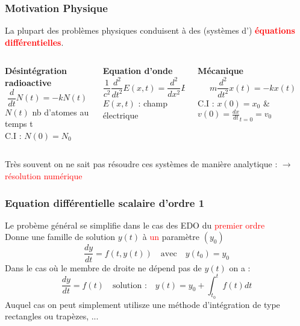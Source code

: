 \documentclass{beamer}
\begin{document}
\begin{frame}
\frametitle{Motivation Physique}
La plupart des problèmes physiques conduisent à des (systèmes d') \textbf{\textcolor{red}{équations différentielles}}. \\
\vspace{0.5cm}
\begin{columns}[t]
\footnotesize
\begin{column}{0.28\textwidth}
\textbf{Désintégration radioactive}
\begin{equation*}
\frac{d}{dt}N(t) = -kN(t)
\end{equation*}
$N(t)$ nb d'atomes au temps t\\
C.I : $N(0)=N_0$
\end{column}
%
\begin{column}{0.38\textwidth}
\textbf{Equation d'onde}
\begin{equation*}
\frac{1}{c^2}\frac{d^2}{dt^2}E(x,t) = \frac{d^2}{dx^2}E(x,t)
\end{equation*}
$E(x,t)$ : champ électrique
\end{column}
%
\begin{column}{0.28\textwidth}
\textbf{Mécanique}
\begin{equation*}
m\frac{d^2}{dt^2}x(t) = -kx(t)
\end{equation*}
C.I : $x(0) = x_0$ \& $v(0) = \frac{dx}{dt}_{t=0} = v_0 $
\end{column}
\end{columns}
\vspace{0.8cm}
Très souvent on ne sait pas résoudre ces systèmes de manière analytique :
\hspace{0.4cm} $\rightarrow$ \textcolor{red}{résolution numérique}

\end{frame}

\begin{frame}
\frametitle{Equation différentielle scalaire d'ordre 1}
Le probème général se simplifie dans le cas des EDO du \textcolor{red}{premier ordre}\\
Donne une famille de solution $y(t)$ à \textcolor{red}{un} paramètre $(y_0)$
\begin{equation*}
\frac{dy}{dt} = f(t,y(t))\quad \text{avec} \quad y(t_0) = y_0
\end{equation*}
\vspace{0.4cm}
Dans le cas où le membre de droite ne dépend pas de $y(t)$ on a :
\begin{equation*}
\frac{dy}{dt} = f(t) \quad \text{solution :} \quad y(t) = y_0 + \int_{t_0}^{t}f(t)dt
\end{equation*}
Auquel cas on peut simplement utilisze une méthode d'intégration de type rectangles ou trapèzes, ...
\end{frame}
\end{document}

